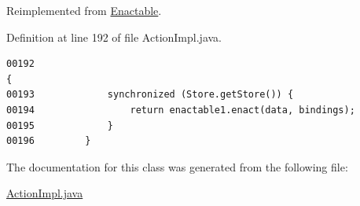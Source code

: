 Reimplemented from \hyperlink{interfaceEnactable_a0}{Enactable}.

Definition at line 192 of file Action\-Impl.java.\footnotesize\begin{verbatim}00192                                                                                    {
00193             synchronized (Store.getStore()) {
00194                 return enactable1.enact(data, bindings);
00195             }
00196         }
\end{verbatim}\normalsize 


The documentation for this class was generated from the following file:\begin{CompactItemize}
\item 
\hyperlink{ActionImpl_8java-source}{Action\-Impl.java}\end{CompactItemize}
